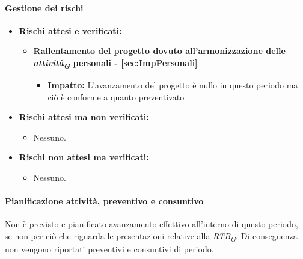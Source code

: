 \paragraph{Gestione dei rischi} 
\begin{itemize}
    \item \textbf{Rischi attesi e verificati:}
\begin{itemize}
    \item \textbf{Rallentamento del progetto dovuto all’armonizzazione delle \textit{attività}\textsubscript{\textit{G}} personali - \ref{sec:ImpPersonali}}
    \begin{itemize}
        \item \textbf{Impatto:}
       L'avanzamento del progetto è nullo in questo periodo ma ciò è conforme a quanto preventivato
    \end{itemize}
\end{itemize}
\item \textbf{Rischi attesi ma non verificati:}
    \begin{itemize}
        \item Nessuno.
    \end{itemize}
    \item \textbf{Rischi non attesi ma verificati:}
    \begin{itemize}
        \item Nessuno.
    \end{itemize}
\end{itemize}
\newpage
\paragraph{Pianificazione attività, preventivo e consuntivo}\hspace{1pt}
Non è previsto e pianificato avanzamento effettivo all’interno di questo periodo, se non per ciò che riguarda
le presentazioni relative alla \textit{RTB}\textsubscript{\textit{G}}.
Di conseguenza non vengono riportati preventivi e consuntivi di periodo.